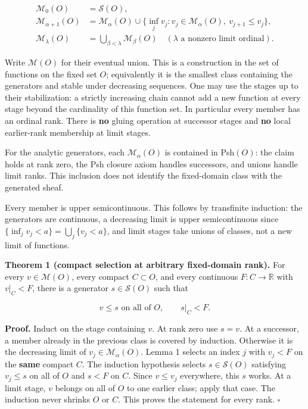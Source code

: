 \documentclass[
  11pt,
]{article}
\begin{document}
\[
\begin{aligned}
\mathcal M_0(O)&=\mathcal S(O),\\
\mathcal M_{\alpha+1}(O)&=\mathcal M_\alpha(O)\cup
 \{\inf_j v_j: v_j\in\mathcal M_\alpha(O),\ v_{j+1}\leq v_j\},\\
\mathcal M_\lambda(O)&=\bigcup_{\beta<\lambda}\mathcal M_\beta(O)
 \quad (\lambda\text{ a nonzero limit ordinal}).
\end{aligned}
\]

Write \(\mathcal M(O)\) for their eventual union. This is a construction
in the set of functions on the fixed set \(O\); equivalently it is the
smallest class containing the generators and stable under decreasing
sequences. One may use the stages up to their stabilization: a strictly
increasing chain cannot add a new function at every stage beyond the
cardinality of this function set. In particular every member has an
ordinal rank. There is \textbf{no} gluing operation at successor stages
and \textbf{no} local earlier-rank membership at limit stages.

For the analytic generators, each \(\mathcal M_\alpha(O)\) is contained
in Psh\((O)\): the claim holds at rank zero, the Psh closure axiom
handles successors, and unions handle limit ranks. This inclusion does
not identify the fixed-domain class with the generated sheaf.

Every member is upper semicontinuous. This follows by transfinite
induction: the generators are continuous, a decreasing limit is upper
semicontinuous since \(\{\inf_jv_j<a\}=\bigcup_j\{v_j<a\}\), and limit
stages take unions of classes, not a new limit of functions.

\textbf{Theorem 1 (compact selection at arbitrary fixed-domain rank).}
For every \(v\in\mathcal M(O)\), every compact \(C\subset O\), and every
continuous \(F:C\to\mathbb R\) with \(v|_C<F\), there is a generator
\(s\in\mathcal S(O)\) such that

\[
v\leq s\text{ on all of }O,\qquad s|_C<F.
\]

\textbf{Proof.} Induct on the stage containing \(v\). At rank zero use
\(s=v\). At a successor, a member already in the previous class is
covered by induction. Otherwise it is the decreasing limit of
\(v_j\in\mathcal M_\alpha(O)\). Lemma 1 selects an index \(j\) with
\(v_j<F\) on the \textbf{same} compact \(C\). The induction hypothesis
selects \(s\in\mathcal S(O)\) satisfying \(v_j\leq s\) on all of \(O\)
and \(s<F\) on \(C\). Since \(v\leq v_j\) everywhere, this \(s\) works.
At a limit stage, \(v\) belongs on all of \(O\) to one earlier class;
apply that case. The induction never shrinks \(O\) or \(C\). This proves
the statement for every rank. \(\square\)
\end{document}
